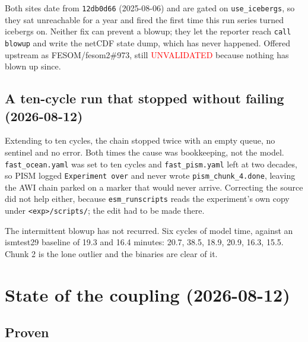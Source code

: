 \documentclass[11pt,a4paper]{article}
\newcommand{\code}[1]{\texttt{\small #1}}
\begin{document}
Both sites date from \code{12db0d66} (2025-08-06) and are gated on \code{use\_icebergs}, so they
sat unreachable for a year and fired the first time this run series turned icebergs on. Neither
fix can prevent a blowup; they let the reporter reach \code{call blowup} and write the netCDF
state dump, which has never happened. Offered upstream as FESOM/fesom2\#973, still
\textcolor{red}{UNVALIDATED} because nothing has blown up since.

\subsection{A ten-cycle run that stopped without failing (2026-08-12)}

Extending to ten cycles, the chain stopped twice with an empty queue, no sentinel and no error.
Both times the cause was bookkeeping, not the model. \code{fast\_ocean.yaml} was set to ten
cycles and \code{fast\_pism.yaml} left at two decades, so PISM logged \code{Experiment over} and
never wrote \code{pism\_chunk\_4.done}, leaving the AWI chain parked on a marker that would never
arrive. Correcting the source did not help either, because \code{esm\_runscripts} reads the
experiment's own copy under \code{<exp>/scripts/}; the edit had to be made there.

The intermittent blowup has not recurred. Six cycles of model time, against an ismtest29 baseline
of 19.3 and 16.4 minutes: 20.7, 38.5, 18.9, 20.9, 16.3, 15.5. Chunk 2 is the lone outlier and the
binaries are clear of it.


\section{State of the coupling (2026-08-12)}
\label{sec:state}

\subsection{Proven}
\end{document}
